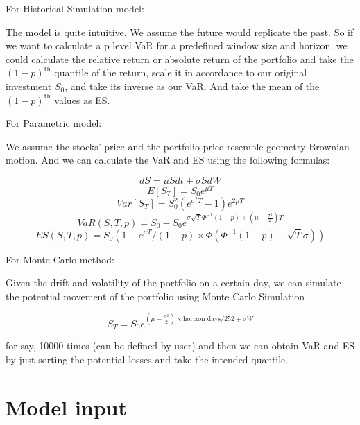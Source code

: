 \documentclass[letterpaper,11pt, oneside]{layout}
\begin{document}
For Historical Simulation model: 

The model is quite intuitive. We assume the future would replicate the past. So if we want to calculate a p level VaR for a predefined window size and horizon, we could calculate the relative return or absolute return of the portfolio and take the $(1-p)^{\text{th}}$ quantile of the return, scale it in accordance to our original investment $S_0$, and take its inverse as our VaR. And take the mean of the $(1-p)^{\text{th}}$ values as ES.

For Parametric model:

We assume the stocks’ price and the portfolio price resemble geometry Brownian motion. And we can calculate the VaR and ES using the following formulas:

\begin{equation}
dS=\mu Sdt+\sigma SdW
\end{equation}
\begin{equation}
E[S_T]=S_0 e^{\mu T}
\end{equation}
\begin{equation}
Var[S_T]=S_0^2( e^{\sigma^2 T}-1)e^{2\mu T}
\end{equation}
\begin{equation*}
VaR(S, T, p)=S_0-S_0 e^{\sigma\sqrt{T}\Phi^{-1}(1-p)+ (\mu-\frac{\sigma^2}{2})T}
\end{equation*}
\begin{equation}
ES(S, T, p)=S_0(1-e^{\mu T}/(1-p)\times\Phi(\Phi^{-1}(1-p)-\sqrt{T}\sigma))
\end{equation}

For Monte Carlo method:

Given the drift and volatility of the portfolio on a certain day, we can simulate the potential movement of the portfolio using Monte Carlo Simulation 

\begin{equation}
S_T=S_0 e^{(\mu-\frac{\sigma^2}{2})\times \text{horizon days}/252+\sigma W}
\end{equation}

for say, 10000 times (can be defined by user) and then we can obtain VaR and ES by just sorting the potential losses and take the intended quantile.


\section{Model input}
\end{document}

